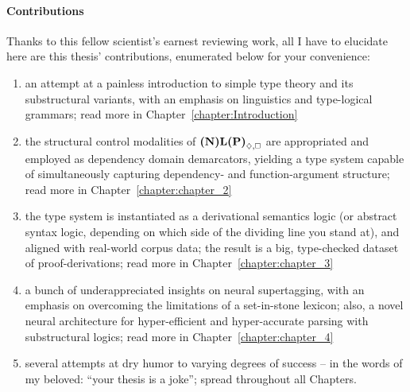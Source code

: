 \paragraph{Contributions}
Thanks to this fellow scientist's earnest reviewing work, all I have to elucidate here are this thesis' contributions, enumerated below for your convenience:
\begin{enumerate}
\item an attempt at a painless introduction to simple type theory and its substructural variants, with an emphasis on linguistics and type-logical grammars; read more in Chapter~\ref{chapter:Introduction}
\item the structural control modalities of $\logic{(N)L(P)}_{\diamond, \bx}$ are appropriated and employed as dependency domain demarcators, yielding a type system capable of simultaneously capturing dependency- and function-argument structure; read more in Chapter~\ref{chapter:chapter_2}
\item the type system is instantiated as a derivational semantics logic (or abstract syntax logic, depending on which side of the dividing line you stand at), and aligned with real-world corpus data; the result is a big, type-checked dataset of proof-derivations; read more in Chapter~\ref{chapter:chapter_3}
\item a bunch of underappreciated insights on neural supertagging, with an emphasis on overcoming the limitations of a set-in-stone lexicon; also, a novel neural architecture for hyper-efficient and hyper-accurate parsing with substructural logics; read more in Chapter~\ref{chapter:chapter_4}
\item several attempts at dry humor to varying degrees of success -- in the words of my beloved: ``your thesis is a joke''; spread throughout all Chapters.
\end{enumerate}
